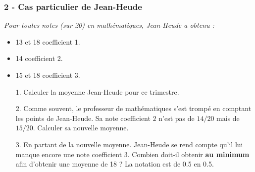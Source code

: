\documentclass[11pt]{article}
\begin{document}
\begin{multicols}{2}

\subsubsection*{2 - Cas particulier de Jean-Heude}

  \textit{Pour toutes notes (sur 20)  en mathématiques, Jean-Heude a obtenu :}
  \begin{itemize}
  \item 13 et 18 coefficient 1.
  \item 14 coefficient 2.
  \item 15 et 18 coefficient 3.
  \end{itemize}

  \begin{enumerate}
  \item[1.] Calculer la moyenne Jean-Heude pour ce trimestre.
  \item[2.] Comme souvent, le professeur de mathématiques s'est trompé en comptant les points de Jean-Heude. Sa note coefficient $2$ n'est pas de $14/20$ mais de $15/20$. Calculer sa nouvelle moyenne.
  \item[3.] En partant de la nouvelle moyenne. Jean-Heude se rend compte qu'il lui manque encore une note coefficient $3$. Combien doit-il obtenir \textbf{au minimum} afin d'obtenir une moyenne de 18 ? La notation est de 0.5 en 0.5.
  \end{enumerate}
\end{multicols}

\newpage
\end{document}

